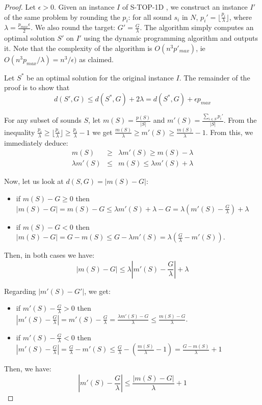 \documentclass[a4paper]{book}
\newtheorem{proof}{\noindent{\bf Proof.} }
\newcommand{\statoned}{{\sc S-TOP-1D }}
\begin{document}
\begin{proof}
Let $\epsilon>0$. Given an instance $I$ of \statoned, we construct an instance $I'$ of the same problem by rounding the $p_i$:  for all sound $s_i$ in $N$, $p_i'= \lfloor \frac{p_i }{\lambda} \rfloor$, where $\lambda=\frac{p_{max} \epsilon}{2}$. We also round the target: $G' =\frac{G}{\lambda}$. The algorithm simply computes an optimal solution $S'$ on $I'$ using the dynamic programming algorithm and outputs it. Note that the complexity of the algorithm is $O(n^3p'_{max})$, ie $O(n^3p_{max}/\lambda)=n^3/\epsilon)$ as claimed.

Let $S^*$ be an optimal solution for the original instance $I$. The remainder of the proof is to show that \begin{equation}\label{eqth3}
d(S',G)\leq d(S^*,G)+2\lambda=d(S^*,G)+\epsilon p_{max}
\end{equation}  


For any subset of sounds $S$, let $m(S) = \frac{p(S)}{|S|}$ and $m'(S) = \frac{\sum_{i \in S} p_i'}{|S|}$. From the inequality $\frac{p_i}{\lambda} \geq \lfloor \frac{p_i}{\lambda} \rfloor \geq \frac{p_i}{\lambda} -1$ we get
$\frac{m(S)}{\lambda} \geq m'(S) \geq \frac{m(S)}{\lambda} -1 $. From this, we immediately deduce:
\begin{eqnarray}
m(S) &\geq & \lambda m'(S) \geq m(S) - \lambda\\
\lambda m'(S) & \leq & m(S) \leq \lambda m'(S) + \lambda
\end{eqnarray}

Now, let us look at $d(S,G)=|m(S)-G|$:
\begin{itemize}
\item if $m(S)-G \geq 0$ then $|m(S)-G| = m(S)-G \leq \lambda m'(S)+\lambda -G = \lambda (m'(S)-\frac{G}{\lambda})+\lambda$
\item  if $m(S)-G < 0$ then
 $|m(S)-G| = G-m(S) \leq G- \lambda m'(S) = \lambda (\frac{G}{\lambda} -m'(S))$.
\end{itemize}
Then, in both cases we have:
\begin{equation}\label{eq2}
|m(S)-G| \leq \lambda \left|m'(S) - \frac{G}{\lambda}\right| + \lambda
\end{equation}

Regarding $|m'(S)-G'|$, we get:
	\begin{itemize}
		\item if $m'(S)-\frac{G}{\lambda} >0$ then  $|m'(S)-\frac{G}{\lambda}| = m'(S)-\frac{G}{\lambda} = \frac{\lambda m'(S) -G}{\lambda} \leq \frac{m(S)-G}{\lambda}$.
		\item if $m'(S)-\frac{G}{\lambda} <0$ then $|m'(S)-\frac{G}{\lambda}| = \frac{G}{\lambda} - m'(S) \leq \frac{G}{\lambda} - (\frac{m(S)}{\lambda}-1) = \frac{G-m(S)}{\lambda} +1$
	\end{itemize}
Then, we have:  
\begin{equation}\label{eq3}
|m'(S)-\frac{G}{\lambda}| \leq \frac{|m(S)-G|}{\lambda} +1
\end{equation}


\end{proof}
\end{document}
